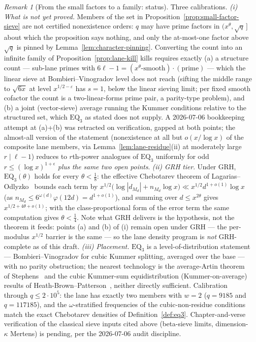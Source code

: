 \documentclass[11pt]{article}
\theoremstyle{plain}
\theoremstyle{definition}
\theoremstyle{remark}
\newtheorem{remark}[theorem]{Remark}
\begin{document}
\begin{remark}[From the small factors to a family: status]
\label{rem:lane-density-status}
Three calibrations.  \emph{(i) What is not yet proved.}  Members of the
set in Proposition~\ref{prop:small-factor-sieve} are not certified
nonexistence orders: $q$ may have prime factors in
$(x^\theta,\sqrt q\,]$ about which the proposition says nothing, and
only the at-most-one factor above $\sqrt q$ is pinned by
Lemma~\ref{lem:character-pinning}.  Converting the count into an
infinite family of Proposition~\ref{prop:lane-kill} kills requires
exactly (a) a structure count --- sub-lane primes with
$6\ell-1=(x^\theta\text{-smooth})\cdot(\text{prime})$ --- which the
linear sieve at Bombieri--Vinogradov level does not reach (sifting the
middle range to $\sqrt{6x}$ at level $x^{1/2-\varepsilon}$ has $s=1$,
below the linear sieving limit; per fixed smooth cofactor the count is
a two-linear-forms prime pair, a parity-type problem), and (b) a joint
(vector-sieve) average running the Kummer conditions relative to the
structured set, which $\mathrm{EQ}_3$ as stated does not supply.  A
2026-07-06 bookkeeping attempt at (a)+(b) was retracted on
verification, gapped at both points; the almost-all version of the
statement (nonexistence at all but $o(x/\log x)$ of the composite lane
members, via Lemma~\ref{lem:lane-residue}(ii) at moderately large
$r\mid\ell-1$) reduces to $r$th-power analogues of $\mathrm{EQ}_3$
uniformly for odd $r\le(\log x)^{1+\epsilon}$ \emph{plus the same two
open points}.  \emph{(ii) GRH tier.}  Under GRH,
$\mathrm{EQ}_3(\theta)$ holds for every $\theta<\tfrac18$: the
effective Chebotarev theorem of Lagarias--Odlyzko~\cite{LO77} bounds
each term by $x^{1/2}\bigl(\log|d_{M_d}|+n_{M_d}\log x\bigr)\ll
x^{1/2}d^{1+o(1)}\log x$ (as
$n_{M_d}\le6^{\omega(d)}\varphi(12d)=d^{1+o(1)}$), and summing over
$d\le x^{2\theta}$ gives $x^{1/2+4\theta+o(1)}$; with the
class-proportional form of the error term the same computation gives
$\theta<\tfrac14$.  Note what GRH delivers is the hypothesis, not the
theorem it feeds: points (a) and (b) of (i) remain open under GRH ---
the per-modulus $x^{1/2}$ barrier is the same --- so the lane density
program is \emph{not} GRH-complete as of this draft.
\emph{(iii) Placement.}  $\mathrm{EQ}_3$ is a level-of-distribution
statement --- Bombieri--Vinogradov for cubic Kummer splitting, averaged
over the base --- with no parity obstruction; the nearest technology is
the average-Artin theorem of Stephens~\cite{Stephens69} and the cubic
Kummer-sum equidistribution (Kummer-on-average) results of
Heath-Brown--Patterson~\cite{HBP79}, neither directly sufficient.
Calibration through $q\le2\cdot10^5$: the lane has exactly two members
with $w=2$ ($q=9185$ and $q=117185$), and the $\omega$-stratified
frequencies of the cubic-non-residue conditions match the exact
Chebotarev densities of Definition~\ref{def:eq3}.  Chapter-and-verse
verification of the classical sieve inputs cited above (beta-sieve
limits, dimension-$\kappa$ Mertens) is pending, per the 2026-07-06
audit discipline.
\end{remark}
\end{document}
